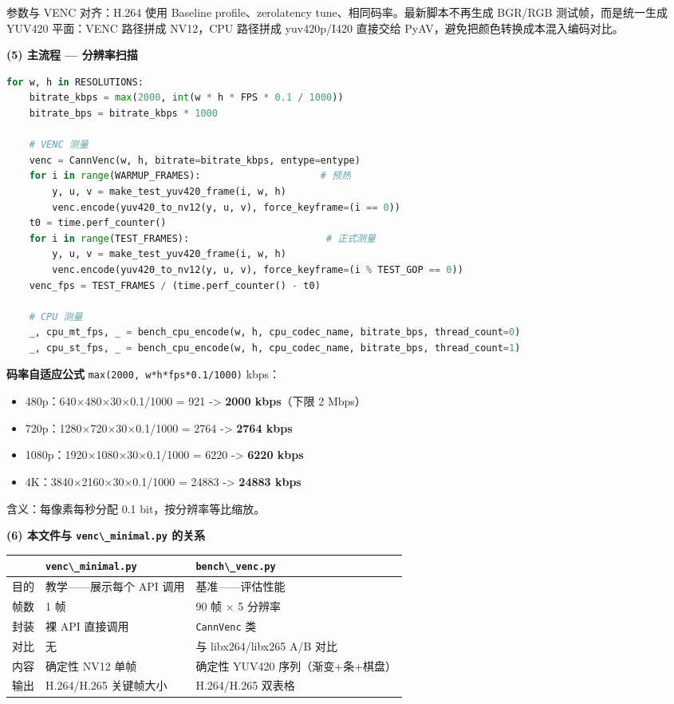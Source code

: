参数与 VENC 对齐：H.264 使用 Baseline profile、zerolatency
tune、相同码率。最新脚本不再生成 BGR/RGB 测试帧，而是统一生成 YUV420
平面：VENC 路径拼成 NV12，CPU 路径拼成 yuv420p/I420 直接交给
PyAV，避免把颜色转换成本混入编码对比。

\textbf{(5) 主流程 --- 分辨率扫描}

\begin{lstlisting}[language=Python]
for w, h in RESOLUTIONS:
    bitrate_kbps = max(2000, int(w * h * FPS * 0.1 / 1000))
    bitrate_bps = bitrate_kbps * 1000

    # VENC 测量
    venc = CannVenc(w, h, bitrate=bitrate_kbps, entype=entype)
    for i in range(WARMUP_FRAMES):                     # 预热
        y, u, v = make_test_yuv420_frame(i, w, h)
        venc.encode(yuv420_to_nv12(y, u, v), force_keyframe=(i == 0))
    t0 = time.perf_counter()
    for i in range(TEST_FRAMES):                        # 正式测量
        y, u, v = make_test_yuv420_frame(i, w, h)
        venc.encode(yuv420_to_nv12(y, u, v), force_keyframe=(i % TEST_GOP == 0))
    venc_fps = TEST_FRAMES / (time.perf_counter() - t0)

    # CPU 测量
    _, cpu_mt_fps, _ = bench_cpu_encode(w, h, cpu_codec_name, bitrate_bps, thread_count=0)
    _, cpu_st_fps, _ = bench_cpu_encode(w, h, cpu_codec_name, bitrate_bps, thread_count=1)
\end{lstlisting}

\textbf{码率自适应公式}
\passthrough{\lstinline!max(2000, w*h*fps*0.1/1000)!} kbps：

\begin{itemize}
\tightlist
\item
  480p：640×480×30×0.1/1000 = 921 -\textgreater{} \textbf{2000
  kbps}（下限 2 Mbps）
\item
  720p：1280×720×30×0.1/1000 = 2764 -\textgreater{} \textbf{2764 kbps}
\item
  1080p：1920×1080×30×0.1/1000 = 6220 -\textgreater{} \textbf{6220 kbps}
\item
  4K：3840×2160×30×0.1/1000 = 24883 -\textgreater{} \textbf{24883 kbps}
\end{itemize}

含义：每像素每秒分配 0.1 bit，按分辨率等比缩放。

\textbf{(6) 本文件与 \passthrough{\lstinline!venc\_minimal.py!} 的关系}

\begin{longtable}[]{@{}lll@{}}
\toprule\noalign{}
& \passthrough{\lstinline!venc\_minimal.py!} &
\passthrough{\lstinline!bench\_venc.py!} \\
\midrule\noalign{}
\endhead
\bottomrule\noalign{}
\endlastfoot
目的 & 教学------展示每个 API 调用 & 基准------评估性能 \\
帧数 & 1 帧 & 90 帧 × 5 分辨率 \\
封装 & 裸 API 直接调用 & \passthrough{\lstinline!CannVenc!} 类 \\
对比 & 无 & 与 libx264/libx265 A/B 对比 \\
内容 & 确定性 NV12 单帧 & 确定性 YUV420 序列（渐变+条+棋盘） \\
输出 & H.264/H.265 关键帧大小 & H.264/H.265 双表格 \\
\end{longtable}

